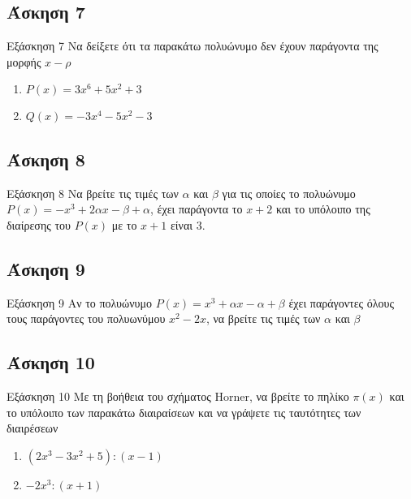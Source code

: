 \documentclass[greek]{beamer}
\begin{document}
\subsection{Άσκηση 7}
\begin{frame}[label=Άσκηση7,t]{Εξάσκηση 7}
 Να δείξετε ότι τα παρακάτω πολυώνυμο δεν έχουν παράγοντα της μορφής $x-ρ$
 \begin{enumerate}
  \item<1-> $P(x)=3x^6+5x^2+3$
  \item<2-> $Q(x)=-3x^4-5x^2-3$
 \end{enumerate}

\end{frame}

\subsection{Άσκηση 8}
\begin{frame}[label=Άσκηση8,t]{Εξάσκηση 8}
 Να βρείτε τις τιμές των $α$ και $β$ για τις οποίες το πολυώνυμο $P(x)=-x^3+2αx-β+α$, έχει παράγοντα το $x+2$ και το υπόλοιπο της διαίρεσης του $P(x)$ με το $x+1$ είναι 3.

\end{frame}

\subsection{Άσκηση 9}
\begin{frame}[label=Άσκηση9,t]{Εξάσκηση 9}
 Αν το πολυώνυμο $P(x)=x^3+αx-α+β$ έχει παράγοντες όλους τους παράγοντες του πολυωνύμου $x^2-2x$, να βρείτε τις τιμές των $α$ και $β$

\end{frame}

\subsection{Άσκηση 10}
\begin{frame}[label=Άσκηση10,t]{Εξάσκηση 10}
 Με τη βοήθεια του σχήματος Horner, να βρείτε το πηλίκο $π(x)$ και το υπόλοιπο των παρακάτω διαιραίσεων και να γράψετε τις ταυτότητες των διαιρέσεων
 \begin{enumerate}
  \item<1-> $(2x^3-3x^2+5):(x-1)$
  \item<2-> $-2x^3:(x+1)$
 \end{enumerate}

\end{frame}
\end{document}
